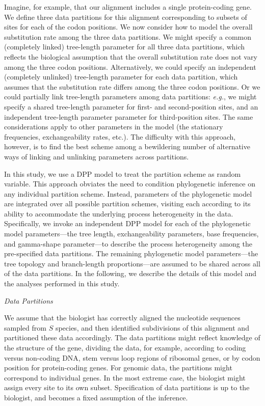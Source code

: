 \documentclass[11pt]{article}
\begin{document}
Imagine, for example, that our alignment includes a single protein-coding gene.
We define three data partitions for this alignment corresponding to subsets of sites for each of the codon positions.
We now consider how to model the overall substitution rate among the three data partitions.
We might specify a common (completely linked) tree-length parameter for all three data partitions, which reflects the biological assumption that the overall substitution rate does not vary among the three codon positions.
Alternatively, we could specify an independent (completely unlinked) tree-length parameter for each data partition, which assumes that the substitution rate differs among the three codon positions.
Or we could partially link tree-length parameters among data partitions: {\it e.g.}, we might specify a shared tree-length parameter for first- and second-position sites, and an independent tree-length parameter parameter for third-position sites.
The same considerations apply to other parameters in the model (the stationary frequencies, exchangeability rates, etc.).
The difficulty with this approach, however, is to find the best scheme among a bewildering number of alternative ways of linking and unlinking parameters across partitions.

In this study, we use a DPP model to treat the partition scheme as random variable.
This approach obviates the need to condition phylogenetic inference on any individual partition scheme.
Instead, parameters of the phylogenetic model are integrated over all possible partition schemes, visiting each according to its ability to accommodate the underlying process heterogeneity in the data.
Specifically, we invoke an independent DPP model for each of the phylogenetic model parameters---the tree length, exchangeability parameters, base frequencies, and gamma-shape parameter---to describe the process heterogeneity among the pre-specified data partitions. 
The remaining phylogenetic model parameters---the tree topology and branch-length proportions---are assumed to be shared across all of the data partitions.
In the following, we describe the details of this model and the analyses performed in this study.

\begin{center}
{\it Data Partitions}
\end{center}

We assume that the biologist has correctly aligned the nucleotide sequences sampled from $S$ species, and then identified subdivisions of this alignment and partitioned these data accordingly. 
The data partitions might reflect knowledge of the structure of the gene, dividing the data, for example, according to coding versus non-coding DNA, stem versus loop regions of ribosomal genes, or by codon position for protein-coding genes.
For genomic data, the partitions might correspond to individual genes. 
In the most extreme case, the biologist might assign every site to its own subset.
Specification of data partitions is up to the biologist, and becomes a fixed assumption of the inference.
\end{document}
